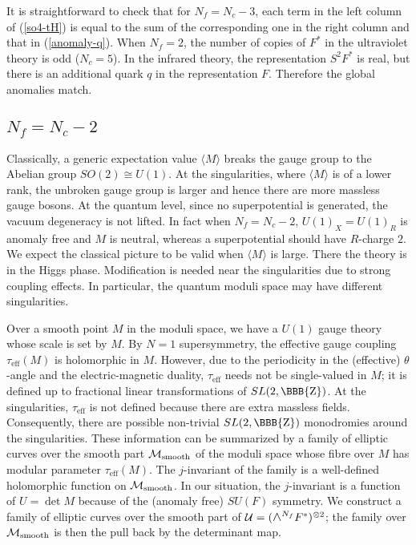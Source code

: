 \documentclass[lecture]{qft-l}
\newcommand{\ZZ}{{\mbox{\BBB{Z}}}}
\newcommand{\medwedge}{\mbox{\fontsize{12pt}{0pt}\selectfont $\wedge$}}
\newcommand{\bra}{\langle}
\newcommand{\ket}{\rangle}
\newcommand{\MM}{{\mathcal M}}
\newcommand{\MS}{\MM_{{\rm smooth}}}
\newcommand{\UU}{{\mathcal U}}
\newcommand{\eff}{_\mathrm{eff}}
\def\Subhead#1{\subsection*{#1}}
\begin{document}
\medskip\noindent
It is straightforward to check that for $N_f=N_c-3$, each term in the left
column of (\ref{so4-tH}) is equal to the sum of the corresponding one in the
right column and that in (\ref{anomaly-q}).
When $N_f=2$, the number of copies of $F^*$ in the ultraviolet theory
is odd ($N_c=5$).
In the infrared theory, the representation $S^2F^*$ is real, but there is
an additional quark $q$ in the representation $F$.
Therefore the global anomalies match.


\Subhead{{\boldmath $N_f=N_c-2$}}

Classically, a generic expectation value $\bra M\ket$ breaks the gauge group
to the Abelian group $SO(2)\cong U(1)$.
At the singularities, where $\bra M\ket$ is of a lower rank, the unbroken
gauge group is larger and hence there are more massless gauge bosons.
At the quantum level, since no superpotential is generated, the vacuum
degeneracy is not lifted.
In fact when $N_f=N_c-2$, $U(1)_X=U(1)_R$ is anomaly free and 
$M$ is neutral, whereas a superpotential should have $R$-charge $2$.
We expect the classical picture to be valid when $\bra M\ket$ is large.
There the theory is in the Higgs phase.
Modification is needed near the singularities due to strong coupling effects.
In particular, the quantum moduli space may have different singularities.

Over a smooth point $M$ in the moduli space, we have a $U(1)$ gauge theory
whose scale is set by $M$.
By $N=1$ supersymmetry, the effective gauge coupling $\tau\eff(M)$ is 
holomorphic in $M$.
However, due to the periodicity in the (effective) $\theta$-angle and
the electric-magnetic duality, $\tau\eff$ needs not be single-valued in $M$;
it is defined up to fractional linear transformations of $SL(2,\ZZ)$.
At the singularities, $\tau\eff$ is not defined because there are extra
massless fields.
Consequently, there are possible non-trivial $SL(2,\ZZ)$ monodromies around
the singularities.
These information can be summarized by a family of elliptic curves over
the smooth part $\MS$ of the moduli space whose fibre over $M$ has modular
parameter $\tau\eff(M)$.
The $j$-invariant of the family is a well-defined holomorphic function on
$\MS$.
In our situation, the $j$-invariant is a function of $U=\det M$ because of
the (anomaly free) $SU(F)$ symmetry.
We construct a family of elliptic curves over the smooth part of
$\UU=(\medwedge^{N_f}F^*)^{\otimes2}$;
the family over $\MS$ is then the pull back by the determinant map.
\end{document}
